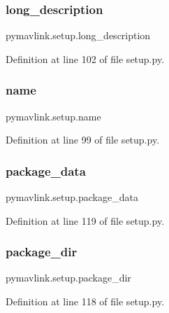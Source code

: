 \subsubsection{\texorpdfstring{long\_description}{long\_description}}
{\footnotesize\ttfamily pymavlink.\+setup.\+long\+\_\+description}



Definition at line 102 of file setup.\+py.

\mbox{\label{namespacepymavlink_1_1setup_a55c91544e4a7dec3602cb3fea4f16a62}} 
\subsubsection{\texorpdfstring{name}{name}}
{\footnotesize\ttfamily pymavlink.\+setup.\+name}



Definition at line 99 of file setup.\+py.

\mbox{\label{namespacepymavlink_1_1setup_af5f94b76aa681079a0e6d64082abc9d4}} 
\subsubsection{\texorpdfstring{package\_data}{package\_data}}
{\footnotesize\ttfamily pymavlink.\+setup.\+package\+\_\+data}



Definition at line 119 of file setup.\+py.

\mbox{\label{namespacepymavlink_1_1setup_acb29c0608917745a4430eec79b719154}} 
\subsubsection{\texorpdfstring{package\_dir}{package\_dir}}
{\footnotesize\ttfamily pymavlink.\+setup.\+package\+\_\+dir}



Definition at line 118 of file setup.\+py.

